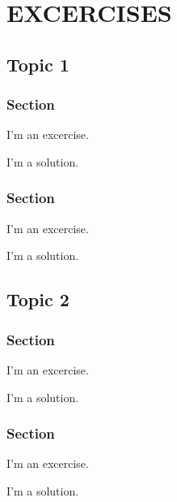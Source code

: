 \documentclass[12pt, a4paper]{book}
\begin{document}
\part{EXCERCISES}
\chapter{Topic 1}

\section{Section}

\begin{exercise}
  I'm an excercise.
\end{exercise}
\begin{solution}
  I'm a solution.
\end{solution}

\section{Section}

\begin{exercise}
  I'm an excercise.
\end{exercise}
\begin{solution}
  I'm a solution.
\end{solution}

\chapter{Topic 2}

\section{Section}
\begin{exercise}
  I'm an excercise.
\end{exercise}
\begin{solution}
  I'm a solution.
\end{solution}

\section{Section}
\begin{exercise}
  I'm an excercise.
\end{exercise}
\begin{solution}
  I'm a solution.
\end{solution}
\end{document}
